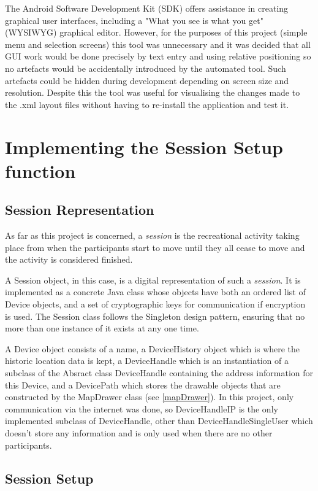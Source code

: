 The Android Software Development Kit (SDK) offers assistance in creating graphical user interfaces, including a "What you see is what you get" (WYSIWYG) graphical editor. However, for the purposes of this project (simple menu and selection screens) this tool was unnecessary and it was decided that all GUI work would be done precisely by text entry and using relative positioning so no artefacts would be accidentally introduced by the automated tool. Such artefacts could be hidden during development depending on screen size and resolution. Despite this the tool was useful for visualising the changes made to the .xml layout files without having to re-install the application and test it.

\section{Implementing the Session Setup function}

\subsection{Session Representation}

As far as this project is concerned, a \emph{session} is the recreational activity taking place from when the participants start to move until they all cease to move and the activity is considered finished.

A Session object, in this case, is a digital representation of such a \emph{session}. It is implemented as a concrete Java class whose objects have both an ordered list of Device objects, and a set of cryptographic keys for communication if encryption is used. The Session class follows the Singleton design pattern, ensuring that no more than one instance of it exists at any one time.

A Device object consists of a name, a DeviceHistory object which is where the historic location data is kept, a DeviceHandle which is an instantiation of a subclass of the Absract class DeviceHandle containing the address information for this Device, and a DevicePath which stores the drawable objects that are constructed by the MapDrawer class (see \ref{mapDrawer}).
In this project, only communication via the internet was done, so DeviceHandleIP is the only implemented subclass of DeviceHandle, other than DeviceHandleSingleUser which doesn't store any information and is only used when there are no other participants.

\subsection{Session Setup}

